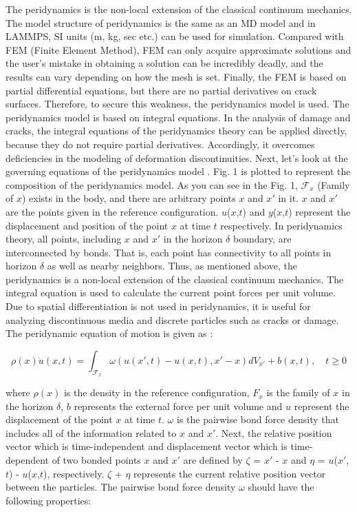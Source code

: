 The peridynamics is the non-local extension of the classical continuum mechanics. The model structure of peridynamics is the same as an MD model and in LAMMPS, SI units (m, kg, sec etc.) can be used for simulation. Compared with FEM (Finite Element Method), FEM can only acquire approximate solutions and the user's mistake in obtaining a solution can be incredibly deadly, and the results can vary depending on how the mesh is set. Finally, the FEM is based on partial differential equations, but there are no partial derivatives on crack surfaces. Therefore, to secure this weakness, the peridynamics model is used. The peridynamics model is based on integral equations. In the analysis of damage and cracks, the integral equations of the peridynamics theory can be applied directly, because they do not require partial derivatives. Accordingly, it overcomes deficiencies in the modeling of deformation discontinuities. Next, let's look at the governing equations of the peridynamics model \cite{Ref2,Ref3,Ref4}. Fig. 1 is plotted to represent the composition of the peridynamics model. As you can see in the Fig. 1, $\mathcal{F}_x$ (Family of $x$) exists in the body, and there are arbitrary points $x$ and ${x'}$ in it. $x$ and ${x'}$ are the points given in the reference configuration. $u$($x$,$t$) and $y$($x$,$t$) represent the displacement and position of the point $x$ at time $t$ respectively. In peridynamics theory, all points, including $x$ and ${x'}$ in the horizon $\delta$ boundary, are interconnected by bonds. That is, each point has connectivity to all points in horizon $\delta$ as well as nearby neighbors. Thus, as mentioned above, the peridynamics is a non-local extension of the classical continuum mechanics. The integral equation is used to calculate the current point forces per unit volume. Due to spatial differentiation is not used in peridynamics, it is useful for analyzing discontinuous media and discrete particles such as cracks or damage. The peridynamic equation of motion is given as :

\begin{equation}
\rho(x)\ddot{u}(x,t)=\int_{\mathcal{F}_x} \omega(u(x',t)-u(x,t),x'-x)dV_{x'}+b(x,t), \quad t\geq0
\end{equation}

 where $\rho(x)$ is the density in the reference configuration, $F_x$ is the family of $x$ in the horizon $\delta$, $b$ represents the external force per unit volume and $u$ represent the displacement of the point $x$ at time $t$. $\omega$ is the pairwise bond force density that includes all of the information related to $x$ and ${x'}$. Next, the relative position vector which is time-independent and displacement vector which is time-dependent of two bonded points $x$ and ${x'}$ are defined by $\zeta$ = ${x'}$ - $x$ and $\eta$ = $u$(${x'}$,$t$) - $u$($x$,$t$), respectively. $\zeta$ + $\eta$ represents the current relative position vector between the particles. The pairwise bond force density $\omega$ should have the following properties: 
 

